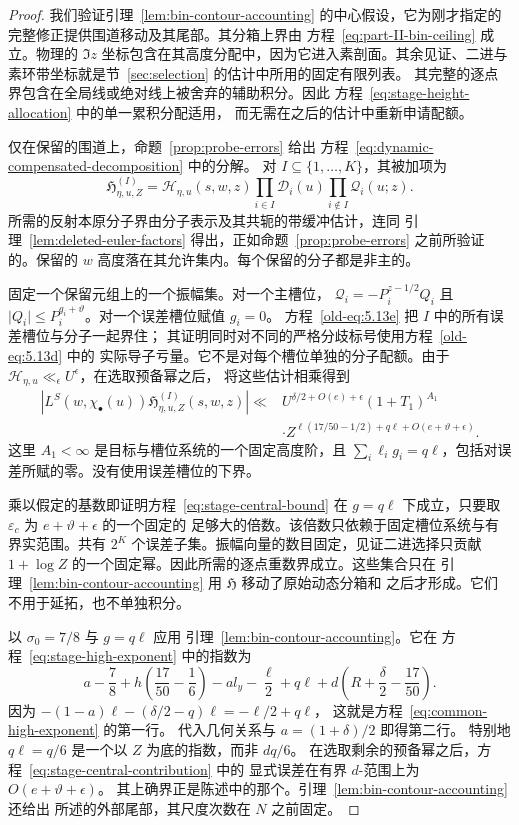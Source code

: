 \begin{proof}
我们验证引理~\ref{lem:bin-contour-accounting} 的中心假设，它为刚才指定的
完整修正提供围道移动及其尾部。其分箱上界由
方程~\eqref{eq:part-II-bin-ceiling} 成立。物理的
\(\Im z\) 坐标包含在其高度分配中，因为它进入素剖面。其余见证、二进与
素环带坐标就是节~\ref{sec:selection} 的估计中所用的固定有限列表。
其完整的逐点界包含在全局线或绝对线上被舍弃的辅助积分。因此
方程~\eqref{eq:stage-height-allocation} 中的单一累积分配适用，
而无需在之后的估计中重新申请配额。

仅在保留的围道上，命题~\ref{prop:probe-errors} 给出
方程~\eqref{eq:dynamic-compensated-decomposition} 中的分解。
对 \(I\subseteq\{1,\ldots,K\}\)，其被加项为
\[
 \mathfrak H_{\eta,u,Z}^{(I)}
 =\mathcal H_{\eta,u}(s,w,z)
       \prod_{i\in I}\mathcal D_i(u)
       \prod_{i\notin I}\mathcal Q_i(u;z).
\]
所需的反射本原分子界由分子表示及其共轭的带缓冲估计，连同
引理~\ref{lem:deleted-euler-factors} 得出，正如命题~\ref{prop:probe-errors}
之前所验证的。保留的 \(w\) 高度落在其允许集内。每个保留的分子都是非主的。

固定一个保留元组上的一个振幅集。对一个主槽位，
\(\mathcal Q_i=-P_i^{z-1/2}Q_i\) 且
\(\lvert Q_i\rvert\le P_i^{g_i+\vartheta}\)。对一个误差槽位赋值 \(g_i=0\)。
方程~\eqref{old-eq:5.13e} 把 \(I\) 中的所有误差槽位与分子一起界住；
其证明同时对不同的严格分歧标号使用方程~\eqref{old-eq:5.13d} 中的
实际导子亏量。它不是对每个槽位单独的分子配额。由于
\(\mathcal H_{\eta,u}\ll_\epsilon U^\epsilon\)，在选取预备幂之后，
将这些估计相乘得到
\[
 \begin{split}
 \left|L^S(w,\chi_\bullet(u))
       \mathfrak H_{\eta,u,Z}^{(I)}(s,w,z)\right|
 \ll{}&U^{\delta/2+O(e)+\epsilon}(1+T_1)^{A_1}\\
 &\cdot
 Z^{\ell(17/50-1/2)+q\ell+O(e+\vartheta+\epsilon)}.
 \end{split}
\]
这里 \(A_1<\infty\) 是目标与槽位系统的一个固定高度阶，且
\(\sum_i\ell_i g_i=q\ell\)，包括对误差所赋的零。没有使用误差槽位的下界。

乘以假定的基数即证明方程~\eqref{eq:stage-central-bound} 在 \(g=q\ell\)
下成立，只要取 \(\varepsilon_c\) 为 \(e+\vartheta+\epsilon\) 的一个固定的
足够大的倍数。该倍数只依赖于固定槽位系统与有界实范围。共有 \(2^K\)
个误差子集。振幅向量的数目固定，见证二进选择只贡献 \(1+\log Z\)
的一个固定幂。因此所需的逐点重数界成立。这些集合只在
引理~\ref{lem:bin-contour-accounting} 用 \(\mathfrak H\) 移动了原始动态分箱和
之后才形成。它们不用于延拓，也不单独积分。

以 \(\sigma_0=7/8\) 与 \(g=q\ell\) 应用
引理~\ref{lem:bin-contour-accounting}。它在
方程~\eqref{eq:stage-high-exponent} 中的指数为
\[
 a-\frac78+h\left(\frac{17}{50}-\frac16\right)-a l_y-\frac{\ell}{2}
       +q\ell+d\left(R+\frac\delta2-\frac{17}{50}\right).
\]
因为
\(-(1-a)\ell-(\delta/2-q)\ell=-\ell/2+q\ell\)，
这就是方程~\eqref{eq:common-high-exponent} 的第一行。
代入几何关系与 \(a=(1+\delta)/2\) 即得第二行。
特别地 \(q\ell=q/6\) 是一个以 \(Z\) 为底的指数，而非 \(dq/6\)。
在选取剩余的预备幂之后，方程~\eqref{eq:stage-central-contribution} 中的
显式误差在有界 \(d\)-范围上为 \(O(e+\vartheta+\epsilon)\)。
其上确界正是陈述中的那个。引理~\ref{lem:bin-contour-accounting} 还给出
所述的外部尾部，其尺度次数在 \(N\) 之前固定。
\end{proof}

